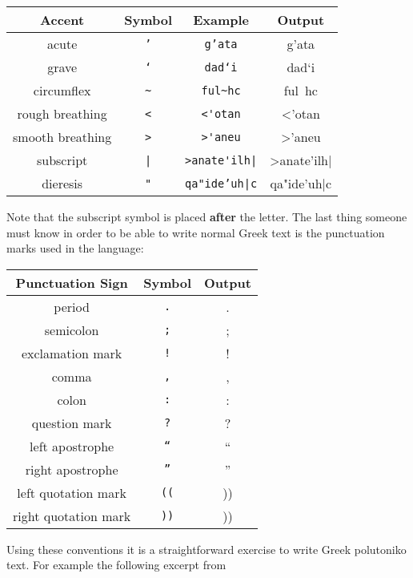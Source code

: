 \documentclass[11pt]{article}
\newcommand{\sg}{\selectlanguage{greek}}
\newcommand{\sa}{\selectlanguage{american}}
\begin{document}
\begin{center}
\begin{tabular}{cccc}\hline
Accent & Symbol & Example & Output\\ \hline
acute  & \texttt{'} & \texttt{g'ata} & \textgreek{g'ata}\\
grave  & \texttt{`} & \texttt{dad`i} & \textgreek{dad`i}\\
circumflex & \verb+~+ & \verb+ful~hc+ & \sg\textgreek{ful~hc}\sa\\
rough breathing & \verb+<+ & \verb+<'otan+ & \sg\textgreek{<'otan}\sa\\
smooth breathing & \verb+>+ & \verb+>'aneu+ & \sg\textgreek{>'aneu}\sa\\
subscript & \texttt{|} & \verb+>anate'ilh|+ & \sg\textgreek{>anate'ilh|}\\
dieresis & \texttt{"}& \texttt{qa"ide'uh|c} & \sg\textgreek{qa"ide'uh|c}\\ 
\hline
\end{tabular}
\end{center}
Note that the subscript symbol is placed \textbf{after} the letter.
The last thing someone must know in order to be able to write normal Greek
text is the punctuation marks used in the language:
\begin{center}
\begin{tabular}{ccc}\hline
Punctuation Sign & Symbol & Output\\ \hline
period   & \texttt{.} & \sg\textgreek{.}\sa\\
semicolon & \texttt{;} & \sg\textgreek{;}\sa\\
exclamation mark & \texttt{!} & \sg\textgreek{!}\sa\\
comma & \texttt{,} & \sg\textgreek{,}\sa\\
colon & \texttt{:} & \sg\textgreek{:}\sa\\
question mark & \texttt{?} & \sg\textgreek{?}\sa\\
left apostrophe & \texttt{``} & \sg\textgreek{``}\sa\\
right apostrophe & \texttt{''} & \sg\textgreek{''}\sa\\
left quotation mark & \texttt{((} & \sg\textgreek{))}\sa\\
right quotation mark & \texttt{))} & \sg\textgreek{))}\sa\\ \hline
\end{tabular}
\end{center}
Using these conventions it is a straightforward exercise to write Greek
\textgreek{polutoniko} text. For example the following excerpt from 
\end{document}
